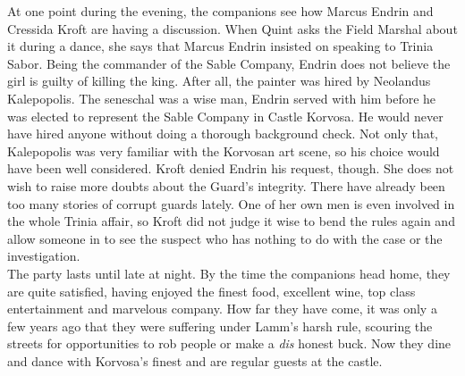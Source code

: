 At one point during the evening, the companions see how Marcus Endrin and Cressida Kroft are having a discussion. When Quint asks the Field Marshal about it during a dance, she says that Marcus Endrin insisted on speaking to Trinia Sabor. Being the commander of the Sable Company, Endrin does not believe the girl is guilty of killing the king. After all, the painter was hired by Neolandus Kalepopolis. The seneschal was a wise man, Endrin served with him before he was elected to represent the Sable Company in Castle Korvosa. He would never have hired anyone without doing a thorough background check. Not only that, Kalepopolis was very familiar with the Korvosan art scene, so his choice would have been well considered. Kroft denied Endrin his request, though. She does not wish to raise more doubts about the Guard's integrity. There have already been too many stories of corrupt guards lately. One of her own men is even involved in the whole Trinia affair, so Kroft did not judge it wise to bend the rules again and allow someone in to see the suspect who has nothing to do with the case or the investigation.\\

The party lasts until late at night. By the time the companions head home, they are quite satisfied, having enjoyed the finest food, excellent wine, top class entertainment and marvelous company. How far they have come, it was only a few years ago that they were suffering under Lamm's harsh rule, scouring the streets for opportunities to rob people or make a {\itshape dis} honest buck. Now they dine and dance with Korvosa's finest and are regular guests at the castle. 